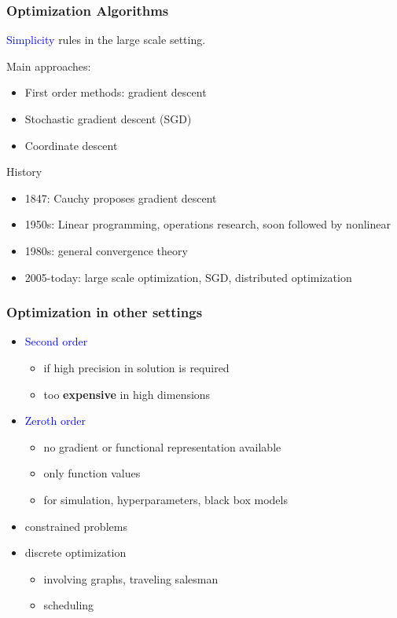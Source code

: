 \documentclass{beamer}
\begin{document}
\begin{frame}
  \frametitle{Optimization Algorithms}
  \begin{center}
    \textcolor{blue}{Simplicity} rules in the large scale setting.
  \end{center}
  Main approaches:
  \begin{itemize}
    \item First order methods: gradient descent
    \item Stochastic gradient descent (SGD)
    \item Coordinate descent
  \end{itemize}

  History
  \begin{itemize}
    \item 1847: Cauchy proposes gradient descent
    \item 1950s: Linear programming, operations research, soon followed by nonlinear
    \item 1980s: general convergence theory
    \item 2005-today: large scale optimization, SGD, distributed optimization
  \end{itemize}
\end{frame}



\begin{frame}
  \frametitle{Optimization in other settings}
  \begin{itemize}
    \item \textcolor{blue}{Second order}
          \begin{itemize}
            \item if high precision in solution is required
            \item too \textbf{expensive} in high dimensions
          \end{itemize}
    \item \textcolor{blue}{Zeroth order}
          \begin{itemize}
             \item no gradient or functional representation available
             \item only function values
             \item for simulation, hyperparameters, black box models
          \end{itemize}
    \item constrained problems
    \item discrete optimization
          \begin{itemize}
            \item involving graphs, traveling salesman
            \item scheduling
          \end{itemize}
  \end{itemize}
\end{frame}
\end{document}

